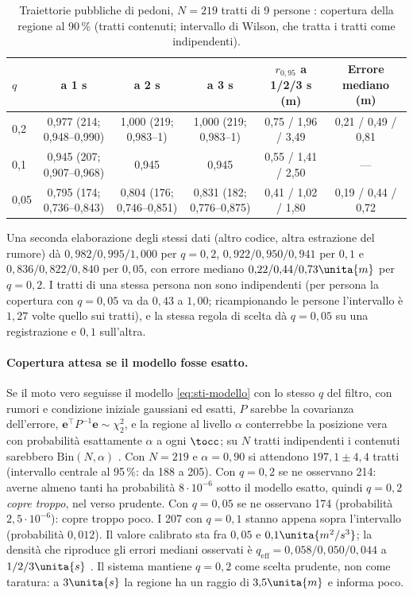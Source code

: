 \begin{table}[H]\centering\footnotesize
\caption{Traiettorie pubbliche di pedoni, $N=219$ tratti di 9 persone : copertura della regione al 90\,\% (tratti contenuti; intervallo di Wilson, che tratta i tratti come indipendenti).}\label{tab:sti-thor}
\begin{tabular}{lccccc}
\toprule
$q$ & a 1 s & a 2 s & a 3 s & $r_{0,95}$ a 1/2/3 s (m) & Errore mediano (m)\\
\midrule
0,2 & 0,977 (214; 0,948--0,990) & 1,000 (219; 0,983--1) & 1,000 (219; 0,983--1) & 0,75 / 1,96 / 3,49 & 0,21 / 0,49 / 0,81\\
0,1 & 0,945 (207; 0,907--0,968) & 0,945 & 0,945 & 0,55 / 1,41 / 2,50 & ---\\
0,05 & 0,795 (174; 0,736--0,843) & 0,804 (176; 0,746--0,851) & 0,831 (182; 0,776--0,875) & 0,41 / 1,02 / 1,80 & 0,19 / 0,44 / 0,72\\
\bottomrule
\end{tabular}
\end{table}
Una seconda elaborazione degli stessi dati (altro codice, altra estrazione del rumore) dà $0{,}982/0{,}995/1{,}000$ per $q=0{,}2$, $0{,}922/0{,}950/0{,}941$ per $0{,}1$ e $0{,}836/0{,}822/0{,}840$ per $0{,}05$, con errore mediano $0{,}22/0{,}44/0{,}73\unita{m}$ per $q=0{,}2$. I tratti di una stessa persona non sono indipendenti (per persona la copertura con $q=0{,}05$ va da $0{,}43$ a $1{,}00$; ricampionando le persone l'intervallo è $1{,}27$ volte quello sui tratti), e la stessa regola di scelta dà $q=0{,}05$ su una registrazione e $0{,}1$ sull'altra.

\paragraph{Copertura attesa se il modello fosse esatto.} Se il moto vero seguisse il modello \eqref{eq:sti-modello} con lo stesso $q$ del filtro, con rumori e condizione iniziale gaussiani ed esatti, $P$ sarebbe la covarianza dell'errore, $\mathbf e^{\top}P^{-1}\mathbf e\sim\chi^2_2$, e la regione al livello $\alpha$ conterrebbe la posizione vera con probabilità esattamente $\alpha$ a ogni $\tocc$; su $N$ tratti indipendenti i contenuti sarebbero $\mathrm{Bin}(N,\alpha)$ . Con $N=219$ e $\alpha=0{,}90$ si attendono $197{,}1\pm4{,}4$ tratti (intervallo centrale al 95\,\%: da 188 a 205). Con $q=0{,}2$ se ne osservano 214: averne almeno tanti ha probabilità $8\cdot10^{-6}$ sotto il modello esatto, quindi $q=0{,}2$ \emph{copre troppo}, nel verso prudente. Con $q=0{,}05$ se ne osservano 174 (probabilità $2{,}5\cdot10^{-6}$): copre troppo poco. I 207 con $q=0{,}1$ stanno appena sopra l'intervallo (probabilità $0{,}012$). Il valore calibrato sta fra $0{,}05$ e $0{,}1\unita{m^2/s^3}$; la densità che riproduce gli errori mediani osservati è $q_{\mathrm{eff}}=0{,}058/0{,}050/0{,}044$ a $1/2/3\unita{s}$ . Il sistema mantiene $q=0{,}2$ come scelta prudente, non come taratura: a $3\unita{s}$ la regione ha un raggio di $3{,}5\unita{m}$ e informa poco.

